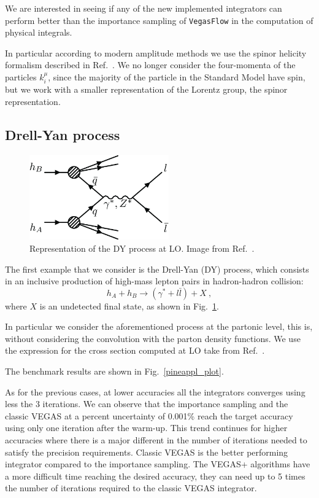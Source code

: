 \documentclass[../main/main.tex]{subfiles}
\begin{document}
We are interested in seeing if any of the new implemented integrators can perform better than the importance sampling of \texttt{VegasFlow} in the computation of physical integrals.

In particular according to modern amplitude methods we use the spinor helicity formalism described in Ref.~\cite{Dixon:1613349}. We no longer consider the four-momenta of the particles $k_i^\mu$, since the majority of the particle in the Standard Model have spin, but we work with a smaller representation of the Lorentz group, the spinor representation.
    
\subsection{Drell-Yan process}

\begin{figure}
	\centering
	\includegraphics[width=6cm]{../images/Drell-Yan-process-a-quark-of-one-hadron-and-an-antiquark-of-another-hadron-annihilate.png}
	\caption{Representation of the DY process at LO. Image from Ref.~\cite{article}.}
	\label{DY}
\end{figure}
The first example that we consider is the Drell-Yan (DY) process, which consists in an inclusive production of high-mass lepton pairs in hadron-hadron collision:
\begin{equation}
	h_A + h_B \rightarrow ( \gamma^* + l \bar{l}) + X  \ ,
\end{equation}
where $X$ is an undetected final state, as shown in Fig.~\ref{DY}.

In particular we consider the aforementioned process at the partonic level, this is, without considering the convolution with the parton density functions. We use the expression for the cross section computed at LO take from Ref.~\cite{Carrazza_2020}.

The benchmark results are shown in Fig.~\ref{pineappl_plot}. 

As for the previous cases, at lower accuracies all the integrators converges using less the 3 iterations. We can observe that the importance sampling and the classic VEGAS at a percent uncertainty of 0.001\% reach the target accuracy using only one iteration after the warm-up.
This trend continues for higher accuracies where there is a major different in the number of iterations needed to satisfy the precision requirements. Classic VEGAS is the better performing integrator compared to the importance sampling. The VEGAS+ algorithms have a more difficult time reaching the desired accuracy, they can need up to 5 times the number of iterations required to the classic VEGAS integrator.
\end{document}
